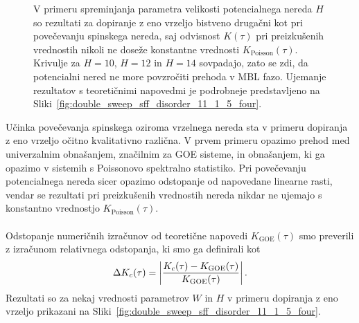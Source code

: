  \begin{figure}[H]
\caption{V primeru spreminjanja parametra velikosti potencialnega nereda $H$ so rezultati za dopiranje z eno vrzeljo bistveno drugačni kot pri povečevanju spinskega nereda, saj odvisnost $K(\tau)$ pri preizkušenih vrednostih nikoli ne doseže konstantne vrednosti $K_\mathrm{Poisson}(\tau).$ Krivulje za $H=10$, $H=12$ in $H=14$ sovpadajo, zato se zdi, da potencialni nered ne more povzročiti prehoda v MBL fazo. Ujemanje rezultatov s teoretičnimi napovedmi je podrobneje predstavljeno na Sliki~\ref{fig:double_sweep_sff_disorder_11_1_5_four}. }
\label{fig:H_sweep_sff_disorder_11_1_5}
\end{figure} 
\noindent
Učinka povečevanja spinskega oziroma vrzelnega nereda sta v primeru dopiranja z eno vrzeljo očitno kvalitativno različna. V prvem primeru opazimo prehod med univerzalnim obnašanjem, značilnim za GOE sisteme, in obnašanjem, ki ga opazimo v sistemih s Poissonovo spektralno statistiko. Pri povečevanju potencialnega nereda sicer opazimo odstopanje od napovedane linearne rasti, vendar se rezultati pri preizkušenih vrednostih nereda nikdar ne ujemajo s konstantno vrednostjo $K_\mathrm{Poisson}(\tau).$\\\\
Odstopanje numeričnih izračunov od teoretične napovedi $K_\mathrm{GOE}(\tau)$ smo preverili z izračunom relativnega odstopanja, ki smo ga definirali kot 
\begin{equation}
\Delta K_c(\tau) = \left| \frac{K_c(\tau) - K_\mathrm{GOE}(\tau)}{K_\mathrm{GOE}(\tau)} \right|.
\end{equation}
Rezultati so za nekaj vrednosti parametrov $W$ in $H$ v primeru dopiranja z eno vrzeljo prikazani na Sliki~\ref{fig:double_sweep_sff_disorder_11_1_5_four}. 
